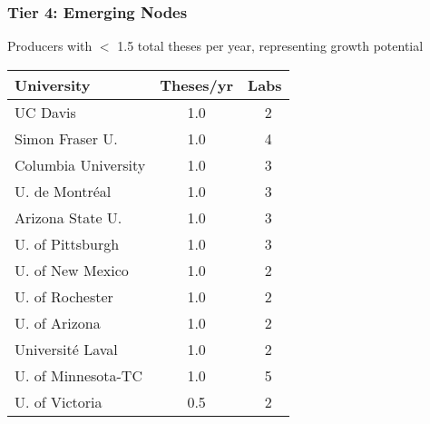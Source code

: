 \documentclass[aspectratio=169]{beamer}
\newcommand{\tabletext}{\small}
\begin{document}
\begin{frame}
    \frametitle{Tier 4: Emerging Nodes}
    Producers with $<$ 1.5 total theses per year, representing growth potential
    
    \begin{table}
        \centering
        \tabletext
        \begin{tabularx}{\textwidth}{
            l
            S[table-format=1.1]
            S[table-format=2.0, table-space-text-pre=~]
        }
            \toprule
            \textbf{University} & {\textbf{Theses/yr}} & {\textbf{Labs}} \\
            \midrule
            UC Davis & 1.0 & ~2 \\
            Simon Fraser U. & 1.0 & ~4 \\
            Columbia University & 1.0 & ~3 \\
            U. de Montréal & 1.0 & ~3 \\
            Arizona State U. & 1.0 & ~3 \\
            U. of Pittsburgh & 1.0 & ~3 \\
            U. of New Mexico & 1.0 & ~2 \\
            U. of Rochester & 1.0 & ~2 \\
            U. of Arizona & 1.0 & ~2 \\
            Université Laval & 1.0 & ~2 \\
            U. of Minnesota-TC & 1.0 & ~5 \\
            U. of Victoria & 0.5 & ~2 \\
            \bottomrule
        \end{tabularx}
    \end{table}
\end{frame}
\end{document}
